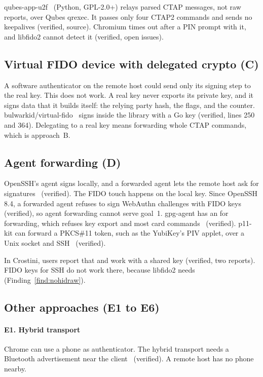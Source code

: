 qubes-app-u2f~\cite{qubes} (Python, GPL-2.0+) relays parsed CTAP messages,
not raw reports, over Qubes qrexec. It passes only four CTAP2 commands and
sends no keepalives (verified, source). Chromium times out after a PIN
prompt with it, and libfido2 cannot detect it (verified, open issues).

\subsection{Virtual FIDO device with delegated crypto (C)}

A software authenticator on the remote host could send only its signing step
to the real key. This does not work. A real key never exports its private
key, and it signs data that it builds itself: the relying party hash, the
flags, and the counter. bulwarkid/virtual-fido~\cite{virtualfido} signs
inside the library with a Go key (verified,  lines 250 and
364). Delegating to a real key means forwarding whole CTAP commands, which
is approach~B.

\subsection{Agent forwarding (D)}

OpenSSH's agent signs locally, and a forwarded agent lets the remote host ask
for signatures~\cite{openssh} (verified). The FIDO touch happens on the local
key. Since OpenSSH 8.4, a forwarded agent refuses to sign WebAuthn challenges
with FIDO keys~\cite{openssh} (verified), so agent forwarding cannot serve
goal~1. gpg-agent has an  for forwarding, which refuses
key export and most card commands~\cite{gnupgfwd} (verified). p11-kit can
forward a PKCS\#11 token, such as the YubiKey's PIV applet, over a Unix
socket and SSH~\cite{p11kit} (verified).

In Crostini, users report that  and  work with a shared
key (verified, two reports). FIDO keys for SSH do not work there, because
libfido2 needs  (Finding~\ref{find:nohidraw}).

\subsection{Other approaches (E1 to E6)}

\paragraph{E1. Hybrid transport} Chrome can use a phone as authenticator.
The hybrid transport needs a Bluetooth advertisement near the
client~\cite{ctap22} (verified). A remote host has no phone nearby.

